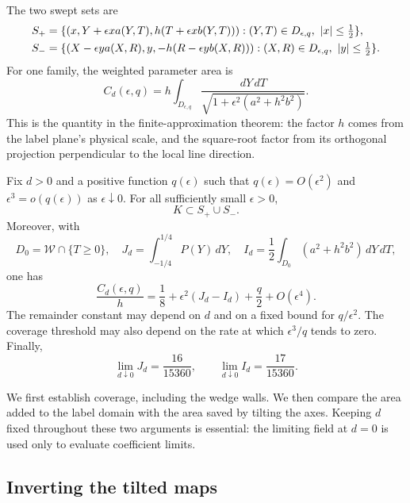 The two swept sets are
\begin{align}
 S_+&=\{(x,Y+\epsilon xa(Y,T),h(T+\epsilon xb(Y,T))):
                 (Y,T)\in D_{\epsilon,q},\ |x|\le\tfrac12\},\notag\\
 S_-&=\{(X-\epsilon ya(X,R),y,-h(R-\epsilon yb(X,R))):
                 (X,R)\in D_{\epsilon,q},\ |y|\le\tfrac12\}.
 \label{c:rat-sweeps}
\end{align}
For one family, the weighted parameter area is
\begin{equation}\label{c:rat-weighted-cost}
 C_d(\epsilon,q)=h\int_{D_{\epsilon,q}}
          \frac{dY\,dT}{\sqrt{1+\epsilon^2(a^2+h^2b^2)}}.
\end{equation}
This is the quantity in the finite-approximation theorem: the factor $h$
comes from the label plane's physical scale, and the square-root factor
from its orthogonal projection perpendicular to the local line direction.

\begin{proposition}\label{c:rat-rational-proposition}
Fix $d>0$ and a positive function $q(\epsilon)$ such that
$q(\epsilon)=O(\epsilon^2)$ and $\epsilon^3=o(q(\epsilon))$ as
$\epsilon\downarrow0$.  For all sufficiently small $\epsilon>0$,
\[
 K\subset S_+\cup S_-.
\]
Moreover, with
\[
 D_0=\mathcal W\cap\{T\ge0\},\quad
 J_d=\int_{-1/4}^{1/4}P(Y)\,dY,\quad
 I_d=\frac12\int_{D_0}(a^2+h^2b^2)\,dY\,dT,
\]
one has
\begin{equation}\label{c:rat-cost-expansion}
 \frac{C_d(\epsilon,q)}h
   =\frac18+\epsilon^2(J_d-I_d)+\frac q2+O(\epsilon^4).
\end{equation}
The remainder constant may depend on $d$ and on a fixed bound for
$q/\epsilon^2$.  The coverage threshold may also depend on the rate
at which $\epsilon^3/q$ tends to zero.  Finally,
\begin{equation}\label{c:rat-coefficient-limits}
 \lim_{d\downarrow0}J_d=\frac{16}{15360},\qquad
 \lim_{d\downarrow0}I_d=\frac{17}{15360}.
\end{equation}
\end{proposition}

We first establish coverage, including the wedge walls.  We then compare
the area added to the label domain with the area saved by tilting the
axes.  Keeping $d$ fixed throughout these two arguments is essential:
the limiting field at $d=0$ is used only to evaluate coefficient limits.

\subsection{Inverting the tilted maps}
\label{c:rat-inverse}

